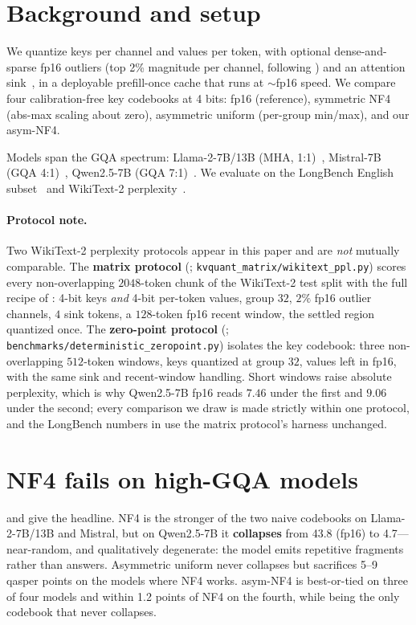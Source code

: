 \documentclass{article}
\theoremstyle{plain}
\theoremstyle{definition}
\newcommand{\collapse}[1]{\textcolor{collapse}{\textbf{#1}}}
\begin{document}
\section{Background and setup}
\label{sec:setup}
We quantize keys per channel and values per token, with optional dense-and-sparse fp16 outliers
(top 2\% magnitude per channel, following \citealp{dettmers2022llmint8}) and an attention
sink~\citep{xiao2024streamingllm}, in a deployable prefill-once cache that runs at ${\sim}$fp16
speed. We compare four calibration-free key codebooks at 4 bits: fp16 (reference), symmetric
NF4 (abs-max scaling about zero), asymmetric uniform (per-group min/max), and our asym-NF4.

Models span the GQA spectrum: Llama-2-7B/13B (MHA, 1:1)~\citep{touvron2023llama2}, Mistral-7B
(GQA 4:1)~\citep{jiang2023mistral}, Qwen2.5-7B (GQA 7:1)~\citep{qwen2025qwen25}. We evaluate on
the LongBench English subset~\citep{bai2024longbench} and WikiText-2
perplexity~\citep{merity2017pointer}.

\paragraph{Protocol note.}
Two WikiText-2 perplexity protocols appear in this paper and are \emph{not} mutually
comparable. The \textbf{matrix protocol} (; \texttt{kvquant\_matrix/wikitext\_ppl.py})
scores every non-overlapping $2048$-token chunk of the WikiText-2 test split with the full
recipe of : 4-bit keys \emph{and} 4-bit per-token values, group $32$, $2\%$
fp16 outlier channels, $4$ sink tokens, a $128$-token fp16 recent window, the settled region
quantized once. The \textbf{zero-point protocol} (;
\texttt{benchmarks/deterministic\_zeropoint.py}) isolates the key codebook: three
non-overlapping $512$-token windows, keys quantized at group $32$, values left in fp16, with
the same sink and recent-window handling. Short windows raise absolute perplexity, which is
why Qwen2.5-7B fp16 reads $7.46$ under the first and $9.06$ under the second; every comparison
we draw is made strictly within one protocol, and the LongBench numbers in  use
the matrix protocol's harness unchanged.

\section{NF4 fails on high-GQA models}
\label{sec:headline}
 and  give the headline. NF4 is the stronger of the two
naive codebooks on Llama-2-7B/13B and Mistral, but on Qwen2.5-7B it \collapse{collapses} from
43.8 (fp16) to 4.7---near-random, and qualitatively degenerate: the model emits repetitive
fragments rather than answers. Asymmetric uniform never collapses but sacrifices 5--9 qasper
points on the models where NF4 works. asym-NF4 is best-or-tied on three of four models and
within 1.2 points of NF4 on the fourth, while being the only codebook that never collapses.
\end{document}
